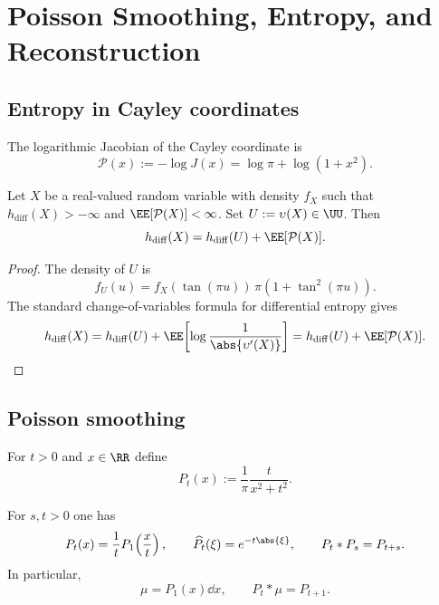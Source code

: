 \section{Poisson Smoothing, Entropy, and Reconstruction}%
\label{sec:precision-potential}

\subsection{Entropy in Cayley coordinates}

The logarithmic Jacobian of the Cayley coordinate is
\begin{equation}\label{eq:precision-potential}
\mathcal P(x):=-\log J(x)=\log\pi+\log(1+x^{2}).
\end{equation}

\begin{theorem}%
\label{thm:precision-ledger}
Let $X$ be a real-valued random variable with density $f_X$ such that
$h_{\mathrm{diff}}(X)>-\infty$ and $\EE[\mathcal P(X)]<\infty$.  Set
$U:=\upsilon(X)\in\UU$.  Then
\begin{equation}\label{eq:entropy-ledger}
h_{\mathrm{diff}}(X)
=h_{\mathrm{diff}}(U)+\EE[\mathcal P(X)].
\end{equation}
\end{theorem}

\begin{proof}
The density of $U$ is
\[
f_U(u)=f_X(\tan(\pi u))\,\pi(1+\tan^2(\pi u)).
\]
The standard change-of-variables formula for differential entropy gives
\[
h_{\mathrm{diff}}(X)
=h_{\mathrm{diff}}(U)+\EE\!\left[\log\frac{1}{\abs{\upsilon'(X)}}\right]
=h_{\mathrm{diff}}(U)+\EE[\mathcal P(X)].
\]
\end{proof}

\subsection{Poisson smoothing}

For $t>0$ and $x\in\RR$ define
\begin{equation}\label{eq:poisson-kernel}
P_t(x):=\frac{1}{\pi}\frac{t}{x^{2}+t^{2}}.
\end{equation}

\begin{proposition}%
\label{prop:poisson-identities}
For $s,t>0$ one has
\begin{equation}\label{eq:poisson-basic}
P_t(x)=\frac{1}{t}P_1\!\left(\frac{x}{t}\right),
\qquad
\widehat{P_t}(\xi)=e^{-t\abs{\xi}},
\qquad
P_t*P_s=P_{t+s}.
\end{equation}
In particular,
\[
\mu=P_1(x)\dd x,
\qquad
P_t*\mu=P_{t+1}.
\]
\end{proposition}

